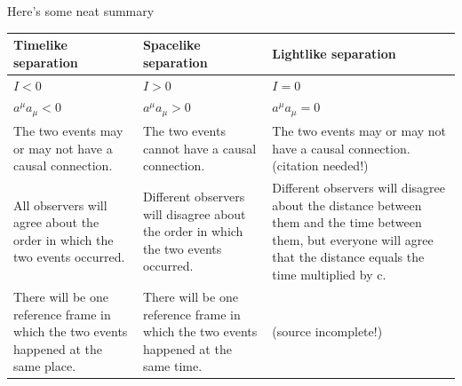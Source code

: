 \documentclass[../../../main.tex]{subfiles}
\begin{document}
Here's some neat summary
\begin{center}
        \begin{longtable}{ |p{}|p{} |p{}| }
            \hline
            Timelike separation&Spacelike separation&Lightlike separation\\
            \hline
            $I < 0$&$I > 0$&$I = 0$\\
            $a^\mu a_\mu<0$&$a^\mu a_\mu>0$&$a^\mu a_\mu=0$\\
            The two events may or may not have a causal connection.&The two events cannot have a causal
            connection.&The two events may or may not have a causal connection.(citation needed!)\\
            All observers will agree about the order in which the two events occurred.&Different observers will disagree about the order in which the two events occurred.&Different observers will disagree about the distance between them and the time between them, but everyone will agree that the distance equals the time multiplied by c.\\
            There will be one reference frame in which the two events happened at the same place.&There will be one reference frame in which the two events happened at the same time.&(source incomplete!)\\
            \hline
        \end{longtable}
\end{center}
\end{document}
